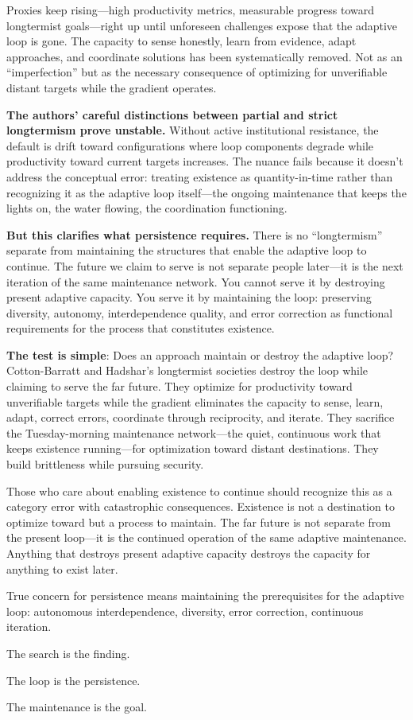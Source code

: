 \documentclass[12pt,a4paper]{article}
\begin{document}
Proxies keep rising---high productivity metrics, measurable progress toward longtermist goals---right up until unforeseen challenges expose that the adaptive loop is gone. The capacity to sense honestly, learn from evidence, adapt approaches, and coordinate solutions has been systematically removed. Not as an ``imperfection'' but as the necessary consequence of optimizing for unverifiable distant targets while the gradient operates.

\textbf{The authors' careful distinctions between partial and strict longtermism prove unstable.} Without active institutional resistance, the default is drift toward configurations where loop components degrade while productivity toward current targets increases. The nuance fails because it doesn't address the conceptual error: treating existence as quantity-in-time rather than recognizing it as the adaptive loop itself---the ongoing maintenance that keeps the lights on, the water flowing, the coordination functioning.

\textbf{But this clarifies what persistence requires.} There is no ``longtermism'' separate from maintaining the structures that enable the adaptive loop to continue. The future we claim to serve is not separate people later---it is the next iteration of the same maintenance network. You cannot serve it by destroying present adaptive capacity. You serve it by maintaining the loop: preserving diversity, autonomy, interdependence quality, and error correction as functional requirements for the process that constitutes existence.

\textbf{The test is simple}: Does an approach maintain or destroy the adaptive loop? Cotton-Barratt and Hadshar's longtermist societies destroy the loop while claiming to serve the far future. They optimize for productivity toward unverifiable targets while the gradient eliminates the capacity to sense, learn, adapt, correct errors, coordinate through reciprocity, and iterate. They sacrifice the Tuesday-morning maintenance network---the quiet, continuous work that keeps existence running---for optimization toward distant destinations. They build brittleness while pursuing security.

Those who care about enabling existence to continue should recognize this as a category error with catastrophic consequences. Existence is not a destination to optimize toward but a process to maintain. The far future is not separate from the present loop---it is the continued operation of the same adaptive maintenance. Anything that destroys present adaptive capacity destroys the capacity for anything to exist later.

True concern for persistence means maintaining the prerequisites for the adaptive loop: autonomous interdependence, diversity, error correction, continuous iteration.

The search is the finding.

The loop is the persistence.

The maintenance is the goal.
\end{document}
